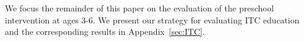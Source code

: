 We focus the remainder of this paper on the evaluation of the preschool intervention at ages 3-6. We present our strategy for evaluating ITC education and the corresponding results in Appendix~\ref{sec:ITC}.

%
%
